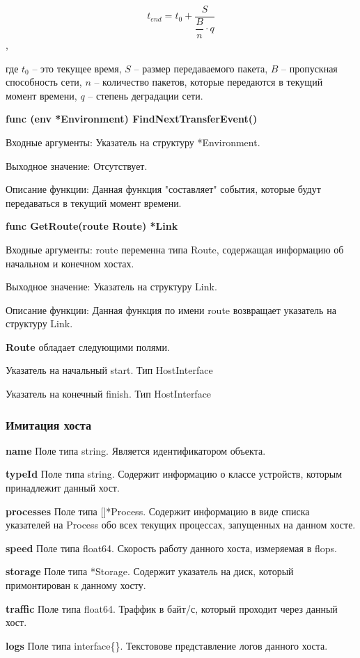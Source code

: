 \[ t_{end} = t_0 + \dfrac{S}{\dfrac{B}{n}  \cdot q }  \], 

где $t_0$ -- это текущее время, \(S\) -- размер передаваемого пакета,  \(B\) -- пропускная способность сети, \(n\) -- количество пакетов, которые передаются в текущий момент времени,  \(q\) -- степень деградации сети. 


\textbf{func (env *Environment) FindNextTransferEvent()}

Входные аргументы: Указатель на структуру *Environment.

Выходное значение: Отсутствует. 

Описание функции: Данная функция "составляет" события, которые будут передаваться в текущий момент времени.  


\textbf{func GetRoute(route Route) *Link}

Входные аргументы: route переменна типа Route, содержащая информацию об начальном и конечном хостах.

Выходное значение: Указатель на структуру Link. 

Описание функции: Данная функция по имени route возвращает указатель на структуру Link.


\textbf{Route} обладает следующими полями.

Указатель на начальный	start. Тип  HostInterface

Указатель на конечный finish. Тип HostInterface



\subsubsection{Имитация хоста}
\textbf{name}      
Поле типа string. Является идентификатором объекта.  

\textbf{typeId} 
Поле типа string. Содержит информацию о классе устройств, которым принадлежит данный хост. 

\textbf{processes} 
Поле типа []*Process. Содержит информацию в виде списка указателей на Process обо всех текущих процессах, запущенных на данном хосте. 

\textbf{speed}     
Поле типа float64. Скорость работу данного хоста, измеряемая в flops.

\textbf{storage}   
Поле типа *Storage. Содержит указатель на диск, который примонтирован к данному хосту.

\textbf{traffic} 
Поле типа float64. Траффик в байт/с, который проходит через данный хост.

\textbf{logs} 
Поле типа interface\{\}. Текстовове представление логов данного хоста.

